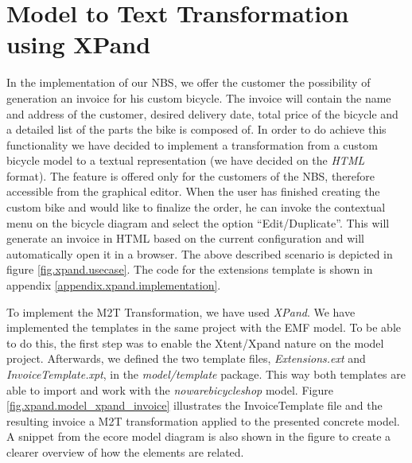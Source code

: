 \section{Model to Text Transformation using XPand}
\label{sec.m2t}
In the implementation of our NBS, we offer the customer the possibility of
generation an invoice for his custom bicycle. The invoice will contain the name
and address of the customer, desired delivery date, total price of the bicycle
and a detailed list of the parts the bike is composed of. In order to do achieve
this functionality we have decided to implement a transformation from a custom
bicycle model to a textual representation (we have decided on the \emph{HTML}
format). The feature is offered only for the customers of the NBS, therefore
accessible from the graphical editor. When the user has finished
creating the custom bike and would like to finalize the order, he can invoke the
contextual menu on the bicycle diagram and select the option ``Edit/Duplicate''.
This will generate an invoice in HTML based on the current configuration and
will automatically open it in a browser. The above described scenario is depicted
in figure \ref{fig.xpand.usecase}. The code for the extensions template is
shown in appendix \ref{appendix.xpand.implementation}.

To implement the M2T Transformation, we have used \emph{XPand}. We have
implemented the templates in the same project with the EMF model. To be able to
do this, the first step was to enable the Xtent/Xpand nature on the model
project. Afterwards, we defined the two template files, \emph{Extensions.ext}
and \emph{InvoiceTemplate.xpt}, in the \emph{model/template} package. This way
both templates are able to import and work with the \emph{nowarebicycleshop}
model. Figure \ref{fig.xpand.model_xpand_invoice} illustrates the
InvoiceTemplate file and the resulting invoice a M2T transformation applied to
the presented concrete model. A snippet from the ecore model diagram is also
shown in the figure to create a clearer overview of how the elements are
related.\\

